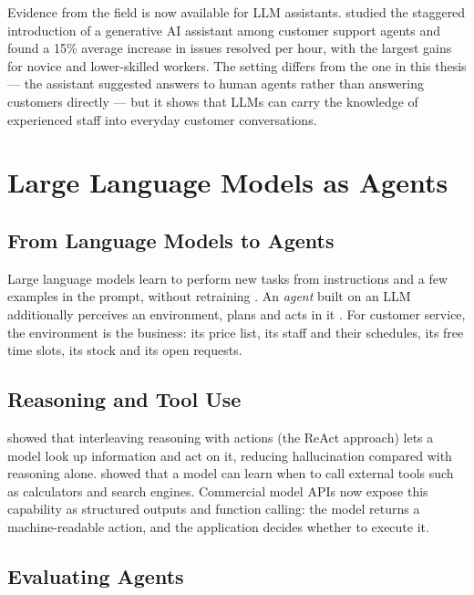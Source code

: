 Evidence from the field is now available for LLM assistants. \textcite{brynjolfsson2025generative} studied the staggered
introduction of a generative AI assistant among customer support agents and found a 15\% average increase in issues
resolved per hour, with the largest gains for novice and lower-skilled workers. The setting differs from the one in this
thesis --- the assistant suggested answers to human agents rather than answering customers directly --- but it shows
that LLMs can carry the knowledge of experienced staff into everyday customer conversations.

\section{Large Language Models as Agents}

\subsection{From Language Models to Agents}

Large language models learn to perform new tasks from instructions and a few examples in the prompt, without retraining
\parencite{brown2020language}. An \emph{agent} built on an LLM additionally perceives an environment, plans and acts in it
\parencite{wang2024survey}. For customer service, the environment is the business: its price list, its staff and their
schedules, its free time slots, its stock and its open requests.

\subsection{Reasoning and Tool Use}

\textcite{yao2023react} showed that interleaving reasoning with actions (the ReAct approach) lets a model look up
information and act on it, reducing hallucination compared with reasoning alone. \textcite{schick2023toolformer} showed
that a model can learn when to call external tools such as calculators and search engines. Commercial model APIs now
expose this capability as structured outputs and function calling: the model returns a machine-readable action, and the
application decides whether to execute it.

\subsection{Evaluating Agents}

